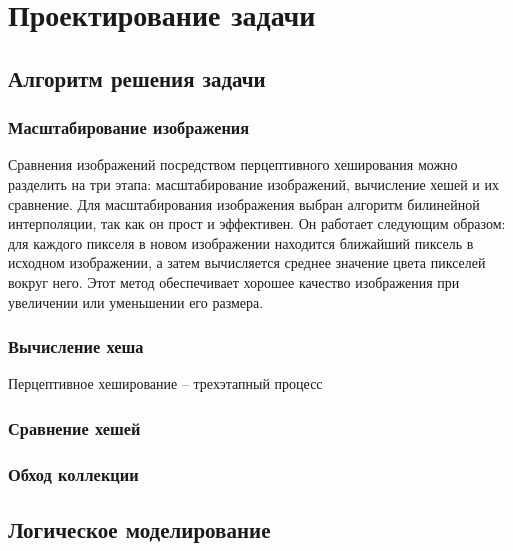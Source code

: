 \chapter{Проектирование задачи}

\section{Алгоритм решения задачи}

\subsection{Масштабирование изображения}
Сравнения изображений посредством перцептивного хеширования можно разделить на
три этапа: масштабирование изображений, вычисление хешей и их сравнение. Для
масштабирования изображения выбран алгоритм билинейной интерполяции, так как он
прост и эффективен. Он работает следующим образом: для каждого пикселя в новом
изображении находится ближайший пиксель в исходном изображении, а затем
вычисляется среднее значение цвета пикселей вокруг него. Этот метод обеспечивает
хорошее качество изображения при увеличении или уменьшении его размера.

\subsection{Вычисление хеша}
Перцептивное хеширование -- трехэтапный процесс

\subsection{Сравнение хешей}

\subsection{Обход коллекции}

\section{Логическое моделирование}

